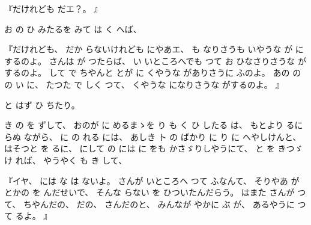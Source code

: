 
『だけれども
だエ？。
』

お
の
ひ
みたるを
みて
は
く
へば、

『だけれども、
%
だか
らないけれども
にやあエ、
%
も
なりさうも
いやうな
が
にするのよ。
%
さんは
が
つたらば、
%
い
いところへでも
つて
お
ひなさりさうな
がするのよ。
%
して
で
ちやんと
とが
に
くやうな
がありさうに
ふのよ。
%
あの
の
の
い
に、
%
たつた
で
しく
つて、
%
くやうな
になりさうな
がするのよ。
』

と
はず
ひ
ちたり。

き
の
を
ずして、
%
おのが
に
めるまゝを
り%
も
く
ひ
したる
は、
%
もとより
るに
らぬ
ながら、
%
に
の
れる
には、
%
あしき
ト
の
ばかり
に
り
に
へやしけんと、
%
はそつと
を
るに、
%
にして
の
には
に
をも
かさゞりしやうにて、
%
と
を
きつゞけ
れば、
%
やうやく
も
き
して、

『イヤ、
%
には
な
は
ないよ。
%
さんが
いところへ
つて
ふなんて、
%
そりやあ
が
とかの
を
んだせいで、
%
そんな
らない
を
ひついたんだらう。
%
はまた
さんが
つて、
%
ちやんだの、
%
だの、
%
さんだのと、
%
みんなが
やかに
ぶ
が、
%
あるやうに
つて
るよ。
』

